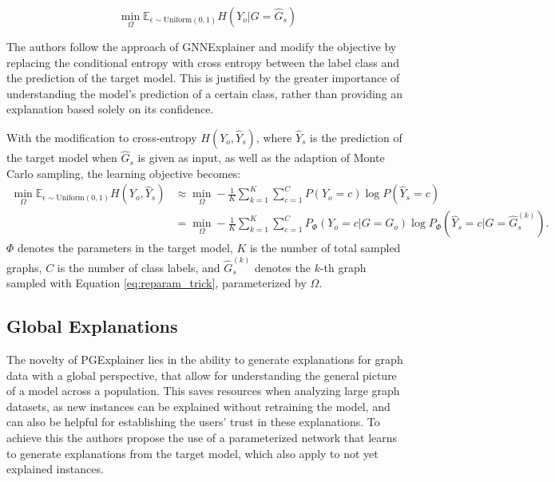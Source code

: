 \begin{equation}
    \min_\Omega \mathbb{E}_{\epsilon \sim \text{Uniform}(0,1)}H(Y_o| G = \hat{G}_s)
\end{equation}

The authors follow the approach of GNNExplainer \cite{ying2019gnnexplainer} and modify the objective by replacing the conditional entropy with cross entropy between the label class and the prediction of the target model. This is justified by the greater importance of understanding the model's prediction of a certain class, rather than providing an explanation based solely on its confidence.

With the modification to cross-entropy $H(Y_o, \hat{Y}_s)$, where $\hat{Y}_s$ is the prediction of the target model when $\hat{G}_s$ is given as input, as well as the adaption of Monte Carlo sampling, the learning objective becomes:
\begin{equation}
    \label{eq:monte_carlo}
    \begin{aligned}
        \min_\Omega\mathbb{E}_{\epsilon\sim\text{Uniform}(0,1)}H(Y_o, \hat{Y}_s) &\approx \min_\Omega -\frac{1}{K}\sum_{k=1}^K\sum_{c=1}^C P(Y_o = c) \log P(\hat{Y}_s = c) \\
        &= \min_\Omega -\frac{1}{K}\sum_{k=1}^K\sum_{c=1}^C P_\Phi (Y_o = c|G = G_o) \log P_\Phi(\hat{Y}_s = c|G=\hat{G}_s^{(k)}).
    \end{aligned}
    \end{equation}
$\Phi$ denotes the parameters in the target model, $K$ is the number of total sampled graphs, $C$ is the number of class labels, and $\hat{G}_s^{(k)}$ denotes the $k$-th graph sampled with Equation \ref{eq:reparam_trick}, parameterized by $\Omega$. %





\subsection{Global Explanations}
\label{sec:Global_Explanations}
The novelty of PGExplainer lies in the ability to generate explanations for graph data with a global perspective, that allow for understanding the general picture of a model across a population. This saves resources when analyzing large graph datasets, as new instances can be explained without retraining the model, and can also be helpful for establishing the users' trust in these explanations. To achieve this the authors propose the use of a parameterized network that learns to generate explanations from the target model, which also apply to not yet explained instances. 

